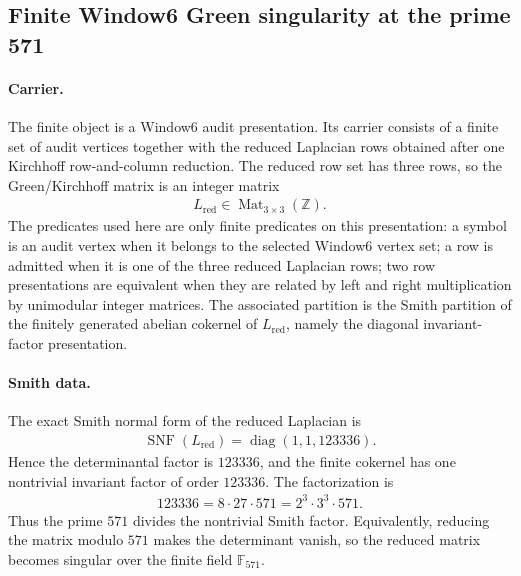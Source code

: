 \subsection{Finite Window6 Green singularity at the prime 571}
\label{sec:window6-modpstar-571-spectral-collision}

\paragraph{Carrier.}
The finite object is a Window6 audit presentation. Its carrier consists of a finite set of audit vertices together with the reduced Laplacian rows obtained after one Kirchhoff row-and-column reduction. The reduced row set has three rows, so the Green/Kirchhoff matrix is an integer matrix
$$
\begin{aligned}
L_{\mathrm{red}} \in \operatorname{Mat}_{3 \times 3}(\mathbb{Z}).
\end{aligned}
$$
The predicates used here are only finite predicates on this presentation: a symbol is an audit vertex when it belongs to the selected Window6 vertex set; a row is admitted when it is one of the three reduced Laplacian rows; two row presentations are equivalent when they are related by left and right multiplication by unimodular integer matrices. The associated partition is the Smith partition of the finitely generated abelian cokernel of $L_{\mathrm{red}}$, namely the diagonal invariant-factor presentation.

\paragraph{Smith data.}
The exact Smith normal form of the reduced Laplacian is
$$
\begin{aligned}
\operatorname{SNF}(L_{\mathrm{red}}) = \operatorname{diag}(1,1,123336).
\end{aligned}
$$
Hence the determinantal factor is $123336$, and the finite cokernel has one nontrivial invariant factor of order $123336$. The factorization is
$$
\begin{aligned}
123336 = 8 \cdot 27 \cdot 571 = 2^3 \cdot 3^3 \cdot 571.
\end{aligned}
$$
Thus the prime $571$ divides the nontrivial Smith factor. Equivalently, reducing the matrix modulo $571$ makes the determinant vanish, so the reduced matrix becomes singular over the finite field $\mathbb{F}_{571}$.

